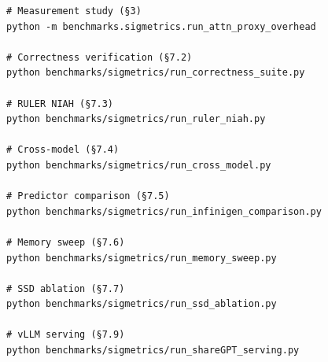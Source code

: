 \documentclass[acmsmall,nonacm,screen]{acmart}
\begin{document}
\begin{verbatim}
# Measurement study (§3)
python -m benchmarks.sigmetrics.run_attn_proxy_overhead

# Correctness verification (§7.2)
python benchmarks/sigmetrics/run_correctness_suite.py

# RULER NIAH (§7.3)
python benchmarks/sigmetrics/run_ruler_niah.py

# Cross-model (§7.4)
python benchmarks/sigmetrics/run_cross_model.py

# Predictor comparison (§7.5)
python benchmarks/sigmetrics/run_infinigen_comparison.py

# Memory sweep (§7.6)
python benchmarks/sigmetrics/run_memory_sweep.py

# SSD ablation (§7.7)
python benchmarks/sigmetrics/run_ssd_ablation.py

# vLLM serving (§7.9)
python benchmarks/sigmetrics/run_shareGPT_serving.py
\end{verbatim}
\end{document}
